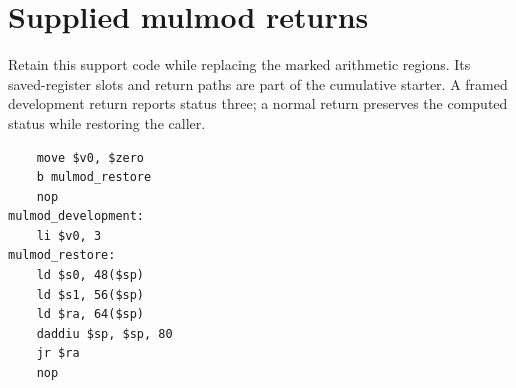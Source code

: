 \section{Supplied mulmod returns}
Retain this support code while replacing the marked arithmetic regions. Its saved-register slots and return paths are part of the cumulative starter. A framed development return reports status three; a normal return preserves the computed status while restoring the caller.

\begin{verbatim}
    move $v0, $zero
    b mulmod_restore
    nop
mulmod_development:
    li $v0, 3
mulmod_restore:
    ld $s0, 48($sp)
    ld $s1, 56($sp)
    ld $ra, 64($sp)
    daddiu $sp, $sp, 80
    jr $ra
    nop
\end{verbatim}
